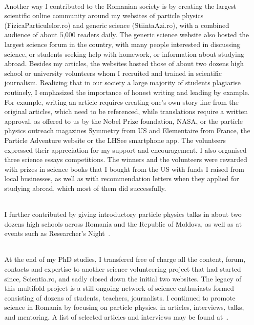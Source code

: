 \documentclass[12pt]{article} %
\begin{document}
\begin{appendices}
\ \\Another way I contributed to the Romanian society is by creating the largest scientific online community around my websites of particle physics (FizicaParticulelor.ro) and generic science (StiintaAzi.ro), with a combined audience of about 5,000 readers daily. The generic science website also hosted the largest science forum in the country, with many people interested in discussing science, or students seeking help with homework, or information about studying abroad. Besides my articles, the websites hosted those of about two dozens high school or university volunteers whom I recruited and trained in scientific journalism. Realizing that in our society a large majority of students plagiarise routinely, I emphasized the importance of honest writing and leading by example. For example, writing an article requires creating one's own story line from the original articles, which need to be referenced, while translations require a written approval, as offered to us by the Nobel Prize foundation, NASA, or the particle physics outreach magazines Symmetry from US and Elementaire from France, the Particle Adventure website or the LHSee smartphone app. The volunteers expressed their appreciation for my support and encouragement. I also organised three science essays competitions. The winners and the volunteers were rewarded with prizes in science books that I bought from the US with funds I raised from local businesses, as well as with recommendation letters when they applied for studying abroad, which most of them did successfully. 

\ \\I further contributed by giving introductory particle physics talks in about two dozens high schools across Romania and the Republic of Moldova, as well as at events such as Researcher's Night~\cite{NoapteaCercetatorilor}. 

\ \\At the end of my PhD studies, I transfered free of charge all the content, forum, contacts and expertise to  another science volunteering project that had started since, Scientia.ro, and sadly closed down the initial two websites. The legacy of this multifold project is a still ongoing network of science enthusiasts formed consisting of dozens of students, teachers, journalists. I continued to promote science in Romania by focusing  on particle physics, in articles, interviews, talks, and mentoring. A list of selected articles and interviews may be found at~\cite{BuzatuOutreach}.


\end{appendices}
\end{document}

